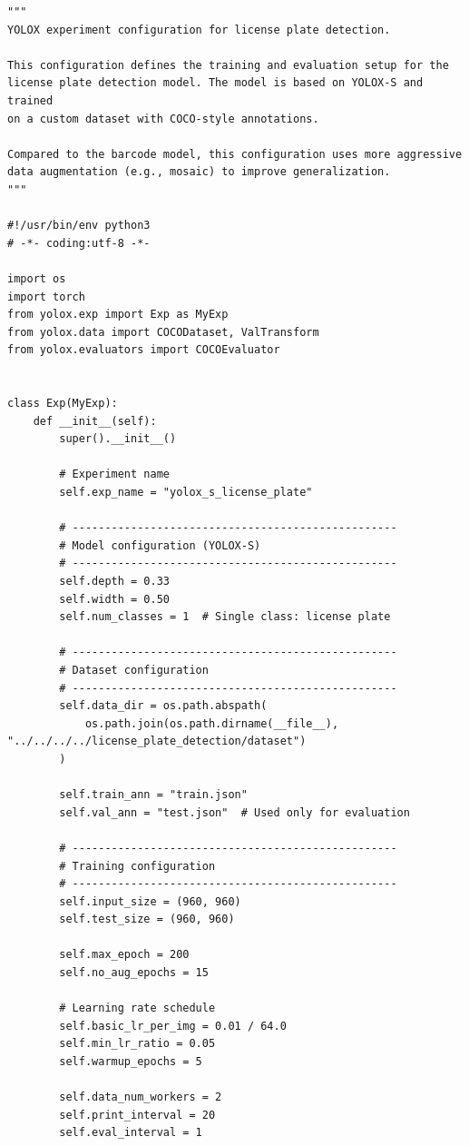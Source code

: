 \begin{lstlisting}[caption={YOLOX experiment file for license plate detection}, label={lst:yolox_licenseplate}]
"""
YOLOX experiment configuration for license plate detection.

This configuration defines the training and evaluation setup for the
license plate detection model. The model is based on YOLOX-S and trained
on a custom dataset with COCO-style annotations.

Compared to the barcode model, this configuration uses more aggressive
data augmentation (e.g., mosaic) to improve generalization.
"""

#!/usr/bin/env python3
# -*- coding:utf-8 -*-

import os
import torch
from yolox.exp import Exp as MyExp
from yolox.data import COCODataset, ValTransform
from yolox.evaluators import COCOEvaluator


class Exp(MyExp):
    def __init__(self):
        super().__init__()

        # Experiment name
        self.exp_name = "yolox_s_license_plate"

        # --------------------------------------------------
        # Model configuration (YOLOX-S)
        # --------------------------------------------------
        self.depth = 0.33
        self.width = 0.50
        self.num_classes = 1  # Single class: license plate

        # --------------------------------------------------
        # Dataset configuration
        # --------------------------------------------------
        self.data_dir = os.path.abspath(
            os.path.join(os.path.dirname(__file__), "../../../../license_plate_detection/dataset")
        )

        self.train_ann = "train.json"
        self.val_ann = "test.json"  # Used only for evaluation

        # --------------------------------------------------
        # Training configuration
        # --------------------------------------------------
        self.input_size = (960, 960)
        self.test_size = (960, 960)

        self.max_epoch = 200
        self.no_aug_epochs = 15

        # Learning rate schedule
        self.basic_lr_per_img = 0.01 / 64.0
        self.min_lr_ratio = 0.05
        self.warmup_epochs = 5

        self.data_num_workers = 2
        self.print_interval = 20
        self.eval_interval = 1


\end{lstlisting}
